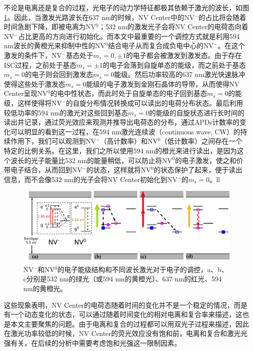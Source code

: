 \documentclass[type = bachelor]{whu-thesis}
\begin{document}
不论是电离还是复合的过程，光电子的动力学特征都极其依赖于激光的波长，如图 \ref{fig: Different Wavelength}。因此，当激发光路波长在637 nm的时候，NV Center中的NV$^-$的占比将会随着时间急剧下降，即被电离为NV$^0$；532 nm的激发光子会将NV Center的电荷态向着NV$^-$占比更高的方向进行初始化。而本文中最重要的一个调控方式就是利用594 nm波长的黄橙光来抑制中性的NV$^0$结合电子从而复合成负电中心的NV$^-$。在这个激发的条件下，NV$^-$基态处于$m_s = 0, ±1$的电子都会被激发到激发态。由于存在ISC过程，之前处于基态$m_s = ±1$的电子会落到自旋单态的能级，而之前处于基态$m_s=0$的电子则会回到激发态$m_s=0$能级。然后功率较高的637 nm激光快速脉冲使得这些处于激发态$m_s=0$能级的电子激发到金刚石晶体的导带，从而使得NV Center呈现NV$^0$的电中性状态，而此时处于自旋单态的电子回到基态$m_s=0$的能级，这样使得将NV$^-$的自旋分布情况转换成可以读出的电荷分布状态。最后利用较低功率的594 nm的激光对这些回到基态$m_s=0$的能级的自旋状态进行长时间的读出并记录，通过荧光效应来观测并推导出电荷态的分布，通过APDs计数率的变化可以明显的看到这一过程，在594 nm激光连续波（continuous wave, CW）的持续作用下，我们可以观测到NV$^-$（高计数率）和NV$^0$（低计数率）之间存在一个特定的比例关系\cite{waldherr2011dark}。在这里，我们之所以使用594 nm的橙光来进行读出，是因为这个波长的光子能量比532 nm的能量稍低，可以防止将NV$^0$的电子激发，使之和价带电子结合，从而回到NV$^-$的状态，这样就将NV$^0$的状态保护了起来，便于读出信息，而不会像532 nm的光子会将NV Center初始化到NV$^-$的$m_s=0$。ll

\begin{figure}
  \centering
  \includegraphics[width=1.0\textwidth]{figures/Chapter 2/Different Wavelength.png}
  \caption[NV$^-$和NV$^0$的电子能级结构和不同波长激光对于电子的调控]{NV$^-$和NV$^0$的电子能级结构和不同波长激光对于电子的调控，a、b、c分别是532 nm的绿光（或594 nm的黄橙光）、637 nm的红光、594 nm的黄橙光\cite{shields2015efficient}。}
  \label{fig: Different Wavelength}
\end{figure}

这些现象表明，NV Center的电荷态随着时间的变化并不是一个稳定的情况，而是有一个动态变化的状态，可以通过随着时间变化的相对电离和复合率来描述，这也是本文主要聚焦的问题。由于电离和复合的过程都可以用双光子过程来描述，因此在激光功率较低的时候，NV Center的荧光效应没有饱和前，电离和复合和激光光强有关，在后续的分析中需要考虑饱和光强这一限制因素。
\end{document}
